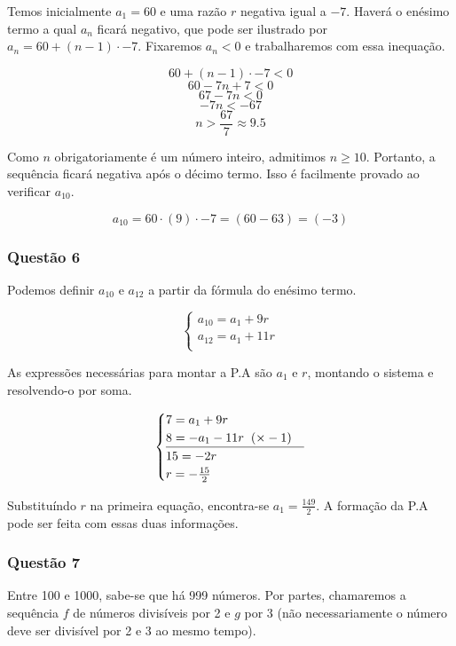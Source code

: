 \documentclass[11pt]{article}
\begin{document}
Temos inicialmente $a_{1} = 60$ e uma razão $r$ negativa igual a $-7$. Haverá o enésimo termo a qual $a_{n}$ ficará negativo, que pode ser ilustrado por $a_{n} = 60 + (n - 1)\cdot -7$. Fixaremos $a_{n} < 0$ e trabalharemos com essa inequação.

\[60 + (n - 1)\cdot -7 < 0\]
\[60 - 7n + 7 < 0\]
\[67 - 7n < 0\]
\[-7n < -67\]
\[n > \frac{67}{7} \approx 9.5\]

Como $n$ obrigatoriamente é um número inteiro, admitimos $n \geq 10$. Portanto, a sequência ficará negativa após o décimo termo. Isso é facilmente provado ao verificar $a_{10}$.

\[a_{10} = 60\cdot (9)\cdot -7 = (60 - 63) = (-3)\]

\subsubsection{Questão 6}

Podemos definir $a_{10}$ e $a_{12}$ a partir da fórmula do enésimo termo.

\begin{equation*}
\begin{cases}
  a_{10} = a_{1} + 9r \\
  a_{12} = a_{1} + 11r \\
\end{cases}
\end{equation*}

As expressões necessárias para montar a P.A são $a_{1}$ e $r$, montando o sistema e resolvendo-o por soma.

\begin{equation*}
\begin{cases}
  7 = a_{1} + 9r \\
  8 = -a_{1} - 11r \hspace{0.2cm} (\times -1)\\
  \hline
  15 = -2r \\
  r = -\frac{15}{2}
\end{cases}
\end{equation*}

Substituíndo $r$ na primeira equação, encontra-se $a_{1} = \frac{149}{2}$. A formação da P.A pode ser feita com essas duas informações.

\subsubsection{Questão 7}

Entre 100 e 1000, sabe-se que há 999 números. Por partes, chamaremos a sequência $f$ de números divisíveis por 2 e $g$ por 3 (não necessariamente o número deve ser divisível por 2 e 3 ao mesmo tempo).
\end{document}
